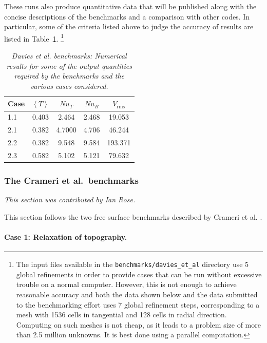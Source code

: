 \documentclass{article}
\begin{document}
These runs also produce quantitative data that will be published along with
the concise descriptions of the benchmarks and a comparison with other
codes. In particular, some of the criteria listed above to judge the accuracy
of results are listed in Table~\ref{tab:davies-et-al-results}.%
\footnote{The input files available in the \texttt{benchmarks/davies\_et\_al}
  directory use 5 global refinements in order to provide cases that can be run
  without excessive trouble on a normal computer. However, this is not enough
  to achieve reasonable accuracy and both the data shown below and the data
  submitted to the benchmarking effort uses 7
  global refinement steps, corresponding to a mesh with 1536 cells in
  tangential and 128 cells in radial direction. Computing on such meshes is
  not cheap, as it leads to a problem size of more than 2.5 million
  unknowns. It is best done using a parallel computation.}

\begin{table}[tbp]
  \centering
  \begin{tabular}{|l|c|c|c|c|}
    \hline
    Case & $\left<T\right>$ & $Nu_T$ & $Nu_B$ & $V_{\text{rms}}$
    \\ \hline
    1.1 & 0.403 & 2.464 & 2.468 & 19.053
    \\
    2.1 & 0.382 & 4.7000 & 4.706 & 46.244
    \\
    2.2 & 0.382 & 9.548 & 9.584 & 193.371
    \\
    2.3 & 0.582 & 5.102 & 5.121 & 79.632
    \\ \hline
  \end{tabular}
  \caption{\it Davies et al. benchmarks: Numerical results for some of the output quantities required by the benchmarks and the various cases considered.}
  \label{tab:davies-et-al-results}
\end{table}


\subsubsection{The Crameri et al.~benchmarks}
\label{sec:benchmark-crameri}

\textit{This section was contributed by Ian Rose.}

This section follows the two free surface benchmarks described by Crameri et al. \cite{CSG12}.

\paragraph{Case 1: Relaxation of topography.}
\label{sec:benchmark-crameri-case-1}
\end{document}
